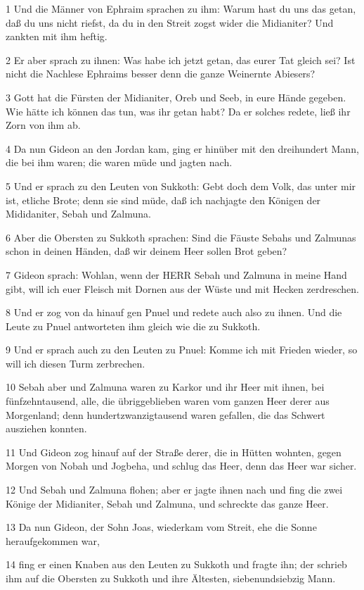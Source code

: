 \par 1 Und die Männer von Ephraim sprachen zu ihm: Warum hast du uns das getan, daß du uns nicht riefst, da du in den Streit zogst wider die Midianiter? Und zankten mit ihm heftig.
\par 2 Er aber sprach zu ihnen: Was habe ich jetzt getan, das eurer Tat gleich sei? Ist nicht die Nachlese Ephraims besser denn die ganze Weinernte Abiesers?
\par 3 Gott hat die Fürsten der Midianiter, Oreb und Seeb, in eure Hände gegeben. Wie hätte ich können das tun, was ihr getan habt? Da er solches redete, ließ ihr Zorn von ihm ab.
\par 4 Da nun Gideon an den Jordan kam, ging er hinüber mit den dreihundert Mann, die bei ihm waren; die waren müde und jagten nach.
\par 5 Und er sprach zu den Leuten von Sukkoth: Gebt doch dem Volk, das unter mir ist, etliche Brote; denn sie sind müde, daß ich nachjagte den Königen der Mididaniter, Sebah und Zalmuna.
\par 6 Aber die Obersten zu Sukkoth sprachen: Sind die Fäuste Sebahs und Zalmunas schon in deinen Händen, daß wir deinem Heer sollen Brot geben?
\par 7 Gideon sprach: Wohlan, wenn der HERR Sebah und Zalmuna in meine Hand gibt, will ich euer Fleisch mit Dornen aus der Wüste und mit Hecken zerdreschen.
\par 8 Und er zog von da hinauf gen Pnuel und redete auch also zu ihnen. Und die Leute zu Pnuel antworteten ihm gleich wie die zu Sukkoth.
\par 9 Und er sprach auch zu den Leuten zu Pnuel: Komme ich mit Frieden wieder, so will ich diesen Turm zerbrechen.
\par 10 Sebah aber und Zalmuna waren zu Karkor und ihr Heer mit ihnen, bei fünfzehntausend, alle, die übriggeblieben waren vom ganzen Heer derer aus Morgenland; denn hundertzwanzigtausend waren gefallen, die das Schwert ausziehen konnten.
\par 11 Und Gideon zog hinauf auf der Straße derer, die in Hütten wohnten, gegen Morgen von Nobah und Jogbeha, und schlug das Heer, denn das Heer war sicher.
\par 12 Und Sebah und Zalmuna flohen; aber er jagte ihnen nach und fing die zwei Könige der Midianiter, Sebah und Zalmuna, und schreckte das ganze Heer.
\par 13 Da nun Gideon, der Sohn Joas, wiederkam vom Streit, ehe die Sonne heraufgekommen war,
\par 14 fing er einen Knaben aus den Leuten zu Sukkoth und fragte ihn; der schrieb ihm auf die Obersten zu Sukkoth und ihre Ältesten, siebenundsiebzig Mann.
